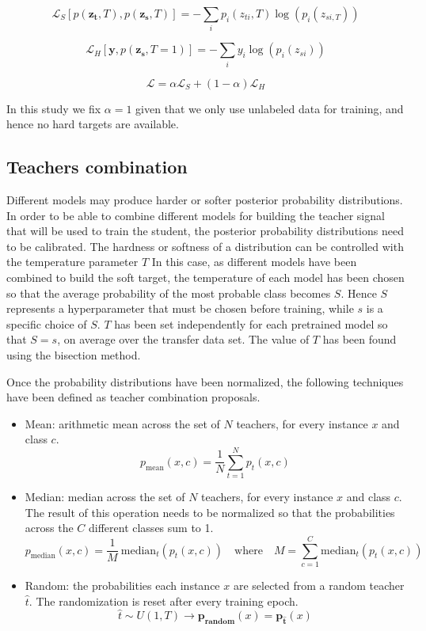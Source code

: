 \documentclass{elsarticle}
\begin{document}
	\begin{equation}
	\mathcal{L}_S\left[p( \mathbf{z_t}, T), p(\mathbf{z_s}, T) \right] = -\sum_i p_i(z_{ti}, T) \log \left(p_i(z_{si, T})\right)
	\label{eq:ced}
	\end{equation}
	
	\begin{equation}
	\mathcal{L}_{H}\left[\mathbf{y}, p(\mathbf{z_s}, T=1) \right] = -\sum_i y_i \log \left(p_i(z_{si})\right)
	\label{eq:ces}
	\end{equation}
	
	\begin{equation}
	\mathcal{L} = \alpha \mathcal{L}_S + (1-\alpha) \mathcal{L}_{H}
	\label{eq:loss_distillation}
	\end{equation}
	
	In this study we fix $\alpha=1$ given that we only use unlabeled data for training, and hence no hard targets are available.
	
	\subsection{Teachers combination} \label{sec:teachers_comb}
	 Different models may produce harder or softer posterior probability distributions. In order to be able to combine  different models for building the teacher signal that will be used to train the student, the posterior probability distributions need to be calibrated. The hardness or softness of a distribution can be controlled with the temperature parameter $T$ In this case, as different models have been combined to build the soft target, the temperature of each model has been chosen so that the average probability of the most probable class becomes $S$. Hence $S$ represents a hyperparameter that must be chosen before training, while $s$ is a specific choice of $S$.  $T$ has been set independently for each pretrained model so that $S=s$, on average over the transfer data set. The value of $T$ has been found using the bisection method.
	 
	 Once the probability distributions have been normalized, the following techniques have been defined as teacher combination proposals.
	 
	 \begin{itemize}
	 	\item Mean: arithmetic mean across the set of $N$ teachers, for every instance $x$ and class $c$. 
	 	$$p_{\text{mean}}(x, c) = \frac{1}{N} \sum_{t=1}^N p_{t}(x, c)$$
	 	\item Median: median across the set of $N$ teachers, for every instance $x$ and class $c$. The result of this operation needs to be normalized so that the probabilities across the $C$ different classes sum to 1. $$p_{\text{median}}(x, c) = \frac{1}{M} \ \text{median}_t( p_{t}(x, c)) \quad \text{where} \quad M = \sum_{c=1}^C  \text{median}_t( p_{t}(x, c))$$
	 	\item Random: the probabilities each instance $x$ are selected from a random teacher $\hat{t}$. The randomization is reset after every training epoch. 
	 	$$\hat{t} \sim U(1, T) \rightarrow \mathbf{p_\text{random}}(x) = \mathbf{p_{\hat{t}}}(x)$$ 
 	\end{itemize}
 
\end{document}
